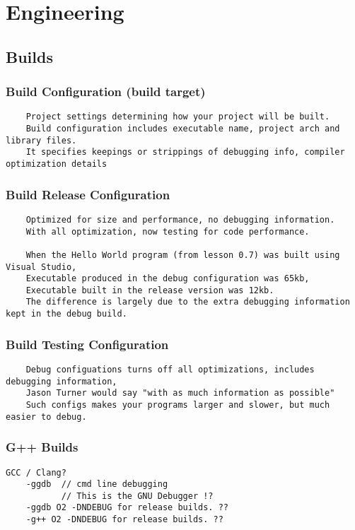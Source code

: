 \chapter{Engineering}
\section{Builds}

\subsection{Build Configuration (build target)}

\begin{verbatim}
    Project settings determining how your project will be built. 
    Build configuration includes executable name, project arch and library files. 
    It specifies keepings or strippings of debugging info, compiler optimization details 
\end{verbatim}

\subsection{Build Release Configuration}

\begin{verbatim}
    Optimized for size and performance, no debugging information.
    With all optimization, now testing for code performance.

    When the Hello World program (from lesson 0.7) was built using Visual Studio,
    Executable produced in the debug configuration was 65kb, 
    Executable built in the release version was 12kb. 
    The difference is largely due to the extra debugging information kept in the debug build.
\end{verbatim}


\subsection{Build Testing Configuration}

\begin{verbatim}
    Debug configuations turns off all optimizations, includes debugging information,
    Jason Turner would say "with as much information as possible"
    Such configs makes your programs larger and slower, but much easier to debug. 
\end{verbatim}

\subsection{G++ Builds}
\begin{verbatim}
GCC / Clang? 
    -ggdb  // cmd line debugging
           // This is the GNU Debugger !?
    -ggdb O2 -DNDEBUG for release builds. ??
    -g++ O2 -DNDEBUG for release builds. ??
\end{verbatim}

